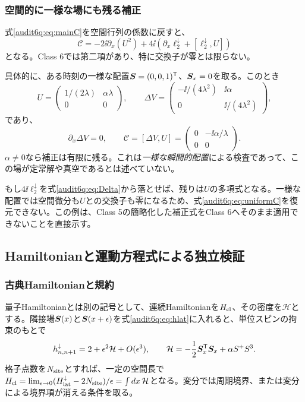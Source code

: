 \subsubsection{空間的に一様な場にも残る補正}
式\eqref{audit6q:eq:mainC}を空間行列の係数に戻すと、
\begin{equation}
\mathcal C=-2\ii\partial_x(U^2)
+4\ii\left(\partial_x\ell_2^\downarrow+[\ell_2^\downarrow,U]\right)
\label{audit6q:eq:sourceexpanded}
\end{equation}
となる。Class 6では第二項があり、特に交換子が零とは限らない。

具体的に、ある時刻の一様な配置$\boldsymbol S=(0,0,1)^{\mathsf T}$、$\boldsymbol S_x=0$を取る。このとき
\begin{equation}
U=\begin{pmatrix}1/(2\lambda)&\alpha\lambda\\0&0\end{pmatrix},\qquad
\Delta V=\begin{pmatrix}-\ii/(4\lambda^2)&\ii\alpha\\0&\ii/(4\lambda^2)\end{pmatrix},
\label{audit6q:eq:uniformmatrices}
\end{equation}
であり、
\begin{equation}
\partial_x\Delta V=0,\qquad
\mathcal C=[\Delta V,U]
=\begin{pmatrix}0&-\ii\alpha/\lambda\\0&0\end{pmatrix}.
\label{audit6q:eq:uniformC}
\end{equation}
$\alpha\ne0$なら補正は有限に残る。これは\emph{一様な瞬間的配置}による検査であって、この場が定常解や真空であるとは述べていない。

もし$4\ii\ell_2^\downarrow$を式\eqref{audit6q:eq:Delta}から落とせば、残りは$U$の多項式となる。一様な配置では空間微分も$U$との交換子も零になるため、式\eqref{audit6q:eq:uniformC}を復元できない。この例は、Class 5の簡略化した補正式をClass 6へそのまま適用できないことを直接示す。

\subsection{Hamiltonianと運動方程式による独立検証}
\subsubsection{古典Hamiltonianと規約}
量子Hamiltonianとは別の記号として、連続Hamiltonianを$H_{\rm cl}$、その密度を$\mathcal H$とする。隣接場$\boldsymbol S(x)$と$\boldsymbol S(x+\epsilon)$を式\eqref{audit6q:eq:hlat}に入れると、単位スピンの拘束のもとで
\begin{equation}
h_{n,n+1}^\downarrow=2+\epsilon^2\mathcal H+O(\epsilon^3),\qquad
\mathcal H=-\frac12\boldsymbol S_x^{\mathsf T}\boldsymbol S_x+\alpha S^+S^3.
\label{audit6q:eq:Hsymbol}
\end{equation}
格子点数を$N_{\rm site}$とすれば、一定の空間長で
$H_{\rm cl}=\lim_{\epsilon\to0}(H_{\rm lat}^\downarrow-2N_{\rm site})/\epsilon
=\int dx\,\mathcal H$となる。変分では周期境界、または変分による境界項が消える条件を取る。

